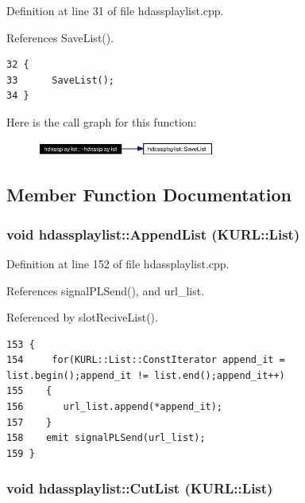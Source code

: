 Definition at line 31 of file hdassplaylist.cpp.

References Save\-List().



\footnotesize\begin{verbatim}32 {
33      SaveList();
34 }
\end{verbatim}\normalsize 


Here is the call graph for this function:\begin{figure}[H]
\begin{center}
\leavevmode
\includegraphics[width=166pt]{classhdassplaylist_hdassplaylista1_cgraph}
\end{center}
\end{figure}


\subsection{Member Function Documentation}
\subsubsection{\setlength{\rightskip}{0pt plus 5cm}void hdassplaylist::Append\-List (KURL::List)\hspace{0.3cm}{\tt  [private]}}\label{classhdassplaylist_hdassplaylistd4}




Definition at line 152 of file hdassplaylist.cpp.

References signal\-PLSend(), and url\_\-list.

Referenced by slot\-Recive\-List().



\footnotesize\begin{verbatim}153 {
154     for(KURL::List::ConstIterator append_it = list.begin();append_it != list.end();append_it++)
155    {
156       url_list.append(*append_it);
157    }
158    emit signalPLSend(url_list);
159 }
\end{verbatim}\normalsize 
{}
\subsubsection{\setlength{\rightskip}{0pt plus 5cm}void hdassplaylist::Cut\-List (KURL::List)\hspace{0.3cm}{\tt  [private]}}\label{classhdassplaylist_hdassplaylistd1}




